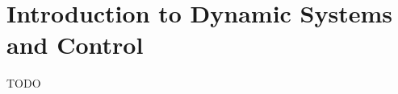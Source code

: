 \section{Introduction to Dynamic Systems and Control}
\label{sec:dynamic_systems_and_control}

TODO

% 
% 
% 
% 
% 
% 
% 
% 
% 
% 
% 
